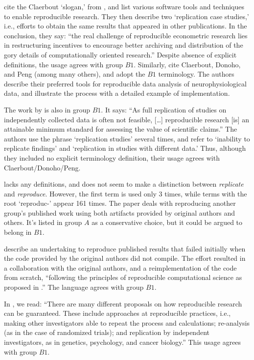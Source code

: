 \documentclass{statement}
\newlength{\up}
\begin{document}
\cite{koenkerETal2009} cite the Claerbout `slogan,' from \cite{buckheit_donoho1995}, and list various software tools and techniques to enable reproducible research. 
They then describe two `replication case studies,' i.e., efforts to obtain the same results that appeared in other publications. 
In the conclusion, they say: ``the real challenge of reproducible econometric research lies in restructuring incentives to encourage better archiving and distribution of the gory details of computationally oriented research.''
Despite absence of explicit definitions, the usage agrees with group $B1$. 
Similarly, \cite{delescluseETal2012} cite Claerbout, Donoho, and Peng (among many others), and adopt the $B1$ terminology. 
The authors describe their preferred tools for reproducible data analysis of neurophysiological data, and illustrate the process with a detailed example of implementation.

The work by \cite{sandveETal2013} is also in group $B1$. It says: ``As full replication of studies on independently collected data is often not feasible, [\ldots] reproducible research [is] an attainable minimum standard for assessing the value of scientific claims.''
The authors use the phrase `replication studies' several times,  and refer to `inability to replicate findings' and `replication in studies with different data.'
Thus, although they included no explicit terminology definition, their usage agrees with  Claerbout/Donoho/Peng.

\cite{garijoETal2013} lacks any definitions, and does not seem to make a distinction between \emph{replicate} and \emph{reproduce}. However, the first term is used only 3 times, while terms with the root `reproduc-' appear 161 times. The paper deals with reproducing another group's published work using both artifacts provided by original authors and others.
It's listed in group $A$ as a conservative choice, but it could be argued to belong in $B1$.

\cite{topalidou2015} describe an undertaking to reproduce published results that failed initially when the code provided by the original authors did not compile. 
The effort resulted in a collaboration with the original authors, and a reimplementation of the code from scratch, ``following the principles of reproducible computational science as proposed in \cite{peng2011}.'' 
The language agrees with group $B1$.

In \cite{iqbalETal2016}, we read: ``There are many different proposals on how reproducible research can be guaranteed. These include approaches at reproducible practices, i.e., making other investigators able to repeat the process and calculations; re-analysis (as in the case of randomized trials); and replication by independent investigators, as in genetics, psychology, and cancer biology.''
This usage agrees with group $B1$.
\end{document}
